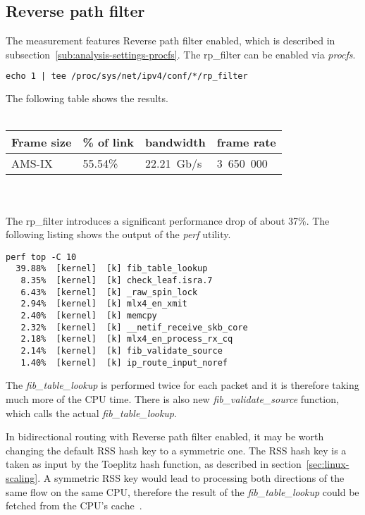 
\subsection{Reverse path filter}
The measurement features Reverse path filter enabled, which is described in subsection~\ref{sub:analysis-settings-procfs}.
The rp\_filter can be enabled via {\it{procfs}}.
\begin{lstlisting}[language=TeX]
echo 1 | tee /proc/sys/net/ipv4/conf/*/rp_filter
\end{lstlisting}
The following table shows the results.
\\
\\
\begin{tabular}{ | l | l | l | l | }
\hline
Frame size & \% of link & bandwidth & frame rate \\
\hline
AMS-IX & 55.54\% & 22.21~Gb/s & 3~650~000 \\
\hline
\end{tabular}
\\
\\
The rp\_filter introduces a significant performance drop of about 37\%.
The following listing shows the output of the {\it{perf}} utility.
\begin{lstlisting}
perf top -C 10
  39.88%  [kernel]  [k] fib_table_lookup
   8.35%  [kernel]  [k] check_leaf.isra.7
   6.43%  [kernel]  [k] _raw_spin_lock
   2.94%  [kernel]  [k] mlx4_en_xmit
   2.40%  [kernel]  [k] memcpy
   2.32%  [kernel]  [k] __netif_receive_skb_core
   2.18%  [kernel]  [k] mlx4_en_process_rx_cq
   2.14%  [kernel]  [k] fib_validate_source
   1.40%  [kernel]  [k] ip_route_input_noref
\end{lstlisting}
The {\it{fib\_table\_lookup}} is performed twice for each packet
and it is therefore taking much more of the CPU time.
There is also new {\it{fib\_validate\_source}} function, which calls
the actual {\it{fib\_table\_lookup}}.

In bidirectional routing with Reverse path filter enabled,
it may be worth changing the default RSS hash key to a symmetric one.
The RSS hash key is a taken as input by the Toeplitz hash function, as described in section~\ref{sec:linux-scaling}.
A symmetric RSS key would lead to processing both directions of the same flow on the same CPU,
therefore the result of the {\it{fib\_table\_lookup}} could be fetched from the CPU's cache~\cite{symetric-rss}.
